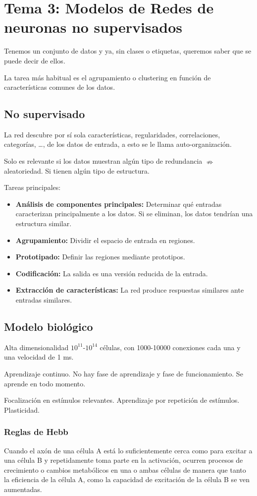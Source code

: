 \documentclass[12pt, twoside, openright]{report} %
\begin{document}
\chapter{Tema 3: Modelos de Redes de neuronas no supervisados}
Tenemos un conjunto de datos y ya, sin clases o etiquetas, queremos saber que se puede decir de ellos.

La tarea más habitual es el agrupamiento o clustering en función de características comunes de los datos.
\section{No supervisado}
La red descubre por sí sola características, regularidades, correlaciones, categorías, …, de los datos de entrada, a esto se le llama auto-organización. 

Solo es relevante si los datos muestran algún tipo de redundancia $\nRightarrow$ aleatoriedad. Si tienen algún tipo de estructura.

Tareas principales:
\begin{itemize}
	\item \textbf{Análisis de componentes principales:} Determinar qué entradas caracterizan principalmente a los datos. Si se eliminan, los datos tendrían una estructura similar.
	\item \textbf{Agrupamiento:} Dividir el espacio de entrada en regiones.
	\item \textbf{Prototipado:} Definir las regiones mediante prototipos.
	\item \textbf{Codificación:} La salida es una versión reducida de la entrada.
	\item \textbf{Extracción de características:} La red produce respuestas similares ante entradas similares.
\end{itemize}

\section{Modelo biológico}
Alta dimensionalidad $10^{11}$-$10^{14}$ células, con 1000-10000 conexiones cada una y una velocidad de 1 ms.

Aprendizaje continuo. No hay fase de aprendizaje y fase de funcionamiento. Se aprende en todo momento.

Focalización en estímulos relevantes. Aprendizaje por repetición de estímulos. Plasticidad.

\subsection{Reglas de Hebb}
Cuando el axón de una célula A está lo suficientemente cerca como para excitar a una célula B y repetidamente toma parte en la activación, ocurren procesos de crecimiento o cambios metabólicos en una o ambas células de manera que tanto la eficiencia de la célula A, como la capacidad de excitación de la célula B se ven aumentadas.
\end{document}
